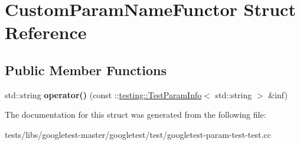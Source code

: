 \hypertarget{structCustomParamNameFunctor}{}\section{Custom\+Param\+Name\+Functor Struct Reference}
\label{structCustomParamNameFunctor}
\subsection*{Public Member Functions}
\begin{DoxyCompactItemize}
\item 
\mbox{\label{structCustomParamNameFunctor_a364d073efd6cb9a05e9d1c97565288ef}} 
std\+::string {\bfseries operator()} (const \+::\hyperlink{structtesting_1_1TestParamInfo}{testing\+::\+Test\+Param\+Info}$<$ std\+::string $>$ \&inf)
\end{DoxyCompactItemize}


The documentation for this struct was generated from the following file\+:\begin{DoxyCompactItemize}
\item 
tests/libs/googletest-\/master/googletest/test/googletest-\/param-\/test-\/test.\+cc\end{DoxyCompactItemize}
